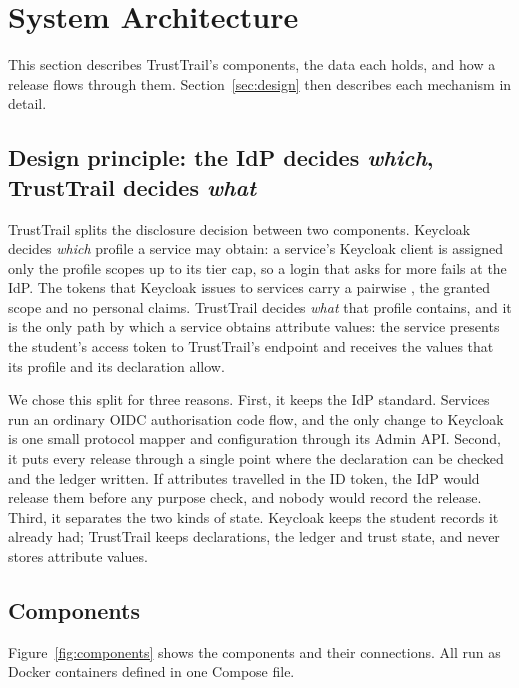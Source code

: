 \section{System Architecture}
\label{sec:architecture}

This section describes TrustTrail's components, the data each holds, and how a release flows through them. Section~\ref{sec:design} then describes each mechanism in detail.

\subsection{Design principle: the IdP decides \emph{which}, TrustTrail decides \emph{what}}
TrustTrail splits the disclosure decision between two components. Keycloak decides \emph{which} profile a service may obtain: a service's Keycloak client is assigned only the profile scopes up to its tier cap, so a login that asks for more fails at the IdP. The tokens that Keycloak issues to services carry a pairwise , the granted scope and no personal claims. TrustTrail decides \emph{what} that profile contains, and it is the only path by which a service obtains attribute values: the service presents the student's access token to TrustTrail's  endpoint and receives the values that its profile and its declaration allow.

We chose this split for three reasons. First, it keeps the IdP standard. Services run an ordinary OIDC authorisation code flow, and the only change to Keycloak is one small protocol mapper and configuration through its Admin API. Second, it puts every release through a single point where the declaration can be checked and the ledger written. If attributes travelled in the ID token, the IdP would release them before any purpose check, and nobody would record the release. Third, it separates the two kinds of state. Keycloak keeps the student records it already had; TrustTrail keeps declarations, the ledger and trust state, and never stores attribute values.

\subsection{Components}
Figure~\ref{fig:components} shows the components and their connections. All run as Docker containers defined in one Compose file.

